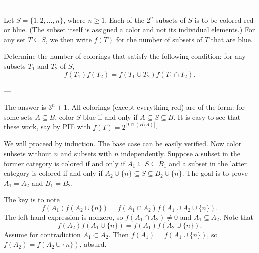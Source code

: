 
---

Let $S=\{1,2,\ldots,n\}$, where $n\ge1$. Each of the $2^n$ subsets of $S$ is to be colored red or blue. (The subset itself is assigned a color and not its individual elements.) For any set $T\subseteq S$, we then write $f(T)$ for the number of subsets of $T$ that are blue.

Determine the number of colorings that satisfy the following condition: for any subsets $T_1$ and $T_2$ of $S$, \[f(T_1)f(T_2)=f(T_1\cup T_2)f(T_1\cap T_2).\]

---

The answer is $3^n+1$. All colorings (except everything red) are of the form: for some sets $A\subseteq B$, color $S$ blue if and only if $A\subseteq S\subseteq B$. It is easy to see that these work, say by PIE with $f(T)=2^{|T\cap(B\setminus A)|}$.

We will proceed by induction. The base case can be easily verified. Now color subsets without $n$ and subsets with $n$ independently. Suppose a subset in the former category is colored if and only if $A_1\subseteq S\subseteq B_1$ and a subset in the latter category is colored if and only if $A_2\cup\{n\}\subseteq S\subseteq B_2\cup\{n\}$. The goal is to prove $A_1=A_2$ and $B_1=B_2$.

The key is to note \[f(A_1)f(A_2\cup\{n\})=f(A_1\cap A_2)f(A_1\cup A_2\cup\{n\}).\]
The left-hand expression is nonzero, so $f(A_1\cap A_2)\ne0$ and $A_1\subseteq A_2$. Note that \[f(A_2)f(A_1\cup\{n\})=f(A_1)f(A_2\cup\{n\}).\]
Assume for contradiction $A_1\subset A_2$. Then $f(A_1)=f(A_1\cup\{n\})$, so $f(A_2)=f(A_2\cup\{n\})$, absurd.

